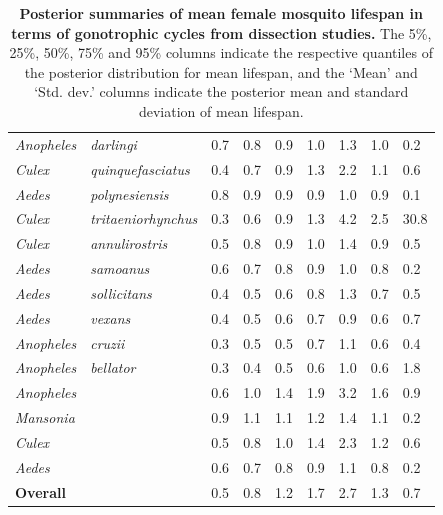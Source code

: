\documentclass[12pt]{article}
\begin{document}
{\begin{table}[htbp]
\begin{tabular}{l|l|l|l|l|l|l|l|l}
		\textit{Anopheles} & \textit{darlingi} & 0.7 & 0.8 & 0.9 & 1.0 & 1.3 & 1.0 & 0.2 \\
		\textit{Culex} & \textit{quinquefasciatus} & 0.4 & 0.7 & 0.9 & 1.3 & 2.2 & 1.1 & 0.6 \\
		\textit{Aedes} & \textit{polynesiensis} & 0.8 & 0.9 & 0.9 & 0.9 & 1.0 & 0.9 & 0.1 \\
		\textit{Culex} & \textit{tritaeniorhynchus} & 0.3 & 0.6 & 0.9 & 1.3 & 4.2 & 2.5 & 30.8 \\
		\textit{Culex} & \textit{annulirostris} & 0.5 & 0.8 & 0.9 & 1.0 & 1.4 & 0.9 & 0.5 \\
		\textit{Aedes} & \textit{samoanus} & 0.6 & 0.7 & 0.8 & 0.9 & 1.0 & 0.8 & 0.2 \\
		\textit{Aedes} & \textit{sollicitans} & 0.4 & 0.5 & 0.6 & 0.8 & 1.3 & 0.7 & 0.5 \\
		\textit{Aedes} & \textit{vexans} & 0.4 & 0.5 & 0.6 & 0.7 & 0.9 & 0.6 & 0.7 \\
		\textit{Anopheles} & \textit{cruzii} & 0.3 & 0.5 & 0.5 & 0.7 & 1.1 & 0.6 & 0.4 \\
		\textit{Anopheles} & \textit{bellator} & 0.3 & 0.4 & 0.5 & 0.6 & 1.0 & 0.6 & 1.8 \\
		\hline
		\textit{Anopheles} & \textit{} & 0.6 & 1.0 & 1.4 & 1.9 & 3.2 & 1.6 & 0.9 \\
		\textit{Mansonia} & \textit{} & 0.9 & 1.1 & 1.1 & 1.2 & 1.4 & 1.1 & 0.2 \\
		\textit{Culex} & \textit{} & 0.5 & 0.8 & 1.0 & 1.4 & 2.3 & 1.2 & 0.6 \\
		\textit{Aedes} & \textit{} & 0.6 & 0.7 & 0.8 & 0.9 & 1.1 & 0.8 & 0.2 \\
		\hline
		\textbf{Overall} & \textit{} & 0.5 & 0.8 & 1.2 & 1.7 & 2.7 & 1.3 & 0.7 \\
	\end{tabular}
\caption{\textbf{Posterior summaries of mean female mosquito lifespan in terms of gonotrophic cycles from dissection studies.} The 5\%, 25\%, 50\%, 75\% and 95\% columns indicate the respective quantiles of the posterior distribution for mean lifespan, and the `Mean' and `Std. dev.' columns indicate the posterior mean and standard deviation of mean lifespan.}
\label{tab:dissection_estimated_lifespans}%
\end{table}

}
\end{document}
